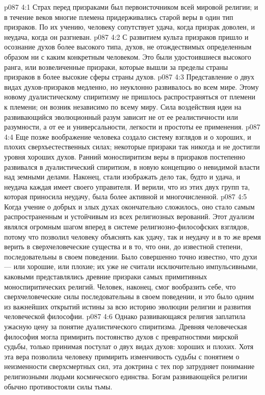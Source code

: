 \vs p087 4:1 Страх перед призраками был первоисточником всей мировой религии; и в течение веков многие племена придерживались старой веры в один тип призраков. По их учению, человеку сопутствует удача, когда призрак доволен, и неудача, когда он разгневан.
\vs p087 4:2 С развитием культа призраков пришло и осознание духов более высокого типа, духов, не отождествимых определенным образом ни с каким конкретным человеком. Это были удостоившиеся высокого ранга, или возвеличенные призраки, которые вышли за пределы страны призраков в более высокие сферы страны духов.
\vs p087 4:3 Представление о двух видах духов\hyp{}призраков медленно, но неуклонно развивалось во всем мире. Этому новому дуалистическому спиритизму не пришлось распространяться от племени к племени; он возник независимо по всему миру. Сила воздействия идеи на развивающийся эволюционный разум зависит не от ее реалистичности или разумности, а от ее  и универсальности, легкости и простоты ее применения.
\vs p087 4:4 Еще позже воображение человека создало систему взглядов и о хороших, и плохих сверхъестественных силах; некоторые призраки так никогда и не достигли уровня хороших духов. Ранний моноспиритизм веры в призраков постепенно развивался в дуалистический спиритизм, в новую концепцию о невидимой власти над земными делами. Наконец, стали изображать дело так, будто и удача, и неудача каждая имеет своего управителя. И верили, что из этих двух групп та, которая приносила неудачу, была более активной и многочисленной.
\vs p087 4:5 \pc Когда учение о добрых и злых духах окончательно сложилось, оно стало самым распространенным и устойчивым из всех религиозных верований. Этот дуализм являлся огромным шагом вперед в системе религиозно\hyp{}философских взглядов, потому что позволил человеку объяснять как удачу, так и неудачу и в то же время верить в сверхчеловеческие существа и в то, что они, до известной степени, последовательны в своем поведении. Было совершенно точно известно, что духи --- или хорошие, или плохие; их уже не считали исключительно импульсивными, каковыми представлялись древние призраки самых примитивных моноспиритических религий. Человек, наконец, смог вообразить себе, что сверхчеловеческие силы последовательны в своем поведении, и это было одним из важнейших открытий истины за всю историю эволюции религии и развития человеческой философии.
\vs p087 4:6 Однако развивающаяся религия заплатила ужасную цену за понятие дуалистического спиритизма. Древняя человеческая философия могла примирить постоянство духов с превратностями мирской судьбы, только принимая постулат о двух видах духов: хороших и плохих. Хотя эта вера позволила человеку примирить изменчивость судьбы с понятием о неизменности сверхсмертных сил, эта доктрина с тех пор затрудняет понимание религиозными людьми космического единства. Богам развивающейся религии обычно противостояли силы тьмы.
